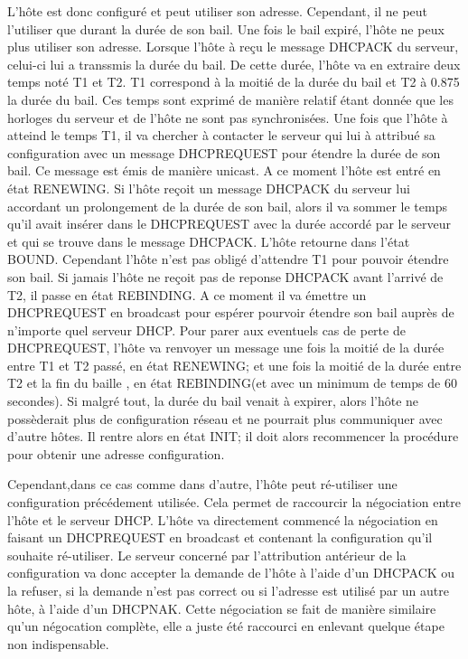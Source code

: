\documentclass[twoside,openright,a4paper,11pt,french]{article}
\begin{document}
L'hôte est donc configuré et peut utiliser son adresse. Cependant, il ne peut l'utiliser que durant la durée de son bail. Une fois le bail expiré, l'hôte ne peux plus utiliser son adresse. Lorsque l'hôte à reçu le message DHCPACK du serveur, celui-ci lui a transsmis la durée du bail. De cette durée, l'hôte va en extraire deux temps noté T1 et T2. T1 correspond à la moitié de la durée du bail et T2 à 0.875 la durée du bail. Ces temps sont exprimé de manière relatif étant donnée que les horloges du serveur et de l'hôte ne sont pas synchronisées.
Une fois que l'hôte à atteind le temps T1, il va chercher à contacter le serveur qui lui à attribué sa configuration avec un message DHCPREQUEST pour étendre la durée de son bail. Ce message est émis de manière unicast. A ce moment l'hôte est entré en état RENEWING. Si l'hôte reçoit un message DHCPACK du serveur lui accordant un prolongement de la durée de son bail, alors il va sommer le temps qu'il avait insérer dans le DHCPREQUEST avec la durée accordé par le serveur et qui se trouve dans le message DHCPACK. L'hôte retourne dans l'état BOUND. Cependant l'hôte n'est pas obligé d'attendre T1 pour pouvoir étendre son bail.
Si jamais l'hôte ne reçoit pas de reponse DHCPACK avant l'arrivé de T2, il passe en état REBINDING. A ce moment il va émettre un DHCPREQUEST en broadcast pour espérer pourvoir étendre son bail auprès de n'importe quel serveur DHCP. Pour parer aux eventuels cas de perte de DHCPREQUEST, l'hôte va renvoyer un message une fois la moitié de la durée entre T1 et T2 passé, en état RENEWING; et une fois la moitié de la durée entre T2 et la fin du baille , en état REBINDING(et avec un minimum de temps de 60 secondes).
Si malgré tout, la durée du bail venait à expirer, alors l'hôte ne possèderait plus de configuration réseau et ne pourrait plus communiquer avec d'autre hôtes. Il rentre alors en état INIT; il doit alors recommencer la procédure pour obtenir une adresse configuration.

Cependant,dans ce cas comme dans d'autre, l'hôte peut ré-utiliser une configuration précédement utilisée. Cela permet de raccourcir la négociation entre l'hôte et le serveur DHCP. L'hôte va directement commencé la négociation en faisant un DHCPREQUEST en broadcast et contenant la configuration qu'il souhaite ré-utiliser. Le serveur concerné par l'attribution antérieur de la configuration va donc accepter la demande de l'hôte à l'aide d'un DHCPACK ou la refuser, si la demande n'est pas correct ou si l'adresse est utilisé par un autre hôte, à l'aide d'un DHCPNAK.
Cette négociation se fait de manière similaire qu'un négocation complète, elle a juste été raccourci en enlevant quelque étape non indispensable.
\end{document}
